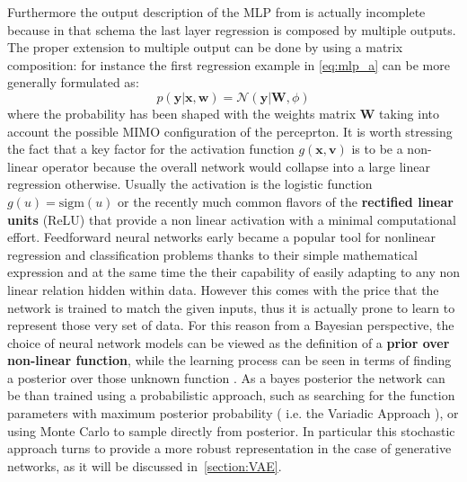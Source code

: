 Furthermore the output description of the \acs{MLP} from \Figure{\ref{fig:generic_mlp_a}} is actually incomplete because in that schema the last layer regression is composed by multiple outputs. 
The proper extension to multiple output can be done by using a matrix composition: for instance the first regression example in \eqref{eq:mlp_a} can be more generally formulated as:
\begin{equation}
    p(\bm{y}|\bm{x}, \bm{w}) = \mathcal{N}\left( \bm{y}|\bm{W},\phi \right)
\end{equation}
where the probability has been shaped with the weights matrix $\bm{W}$ taking into account the possible MIMO configuration of the perceprton.
It is worth stressing the fact that a key factor for the activation function $g(\bm{x},\bm{v})$ is to be a non-linear operator because the overall network would collapse into a large linear regression otherwise. Usually the activation is the logistic function $g(u) = \text{sigm}(u)$ or the recently much common flavors of the \textbf{rectified linear units} (ReLU) that provide a non linear activation with a minimal computational effort.
%
% 
%
Feedforward neural networks early became a popular tool for nonlinear regression and classification problems thanks to their simple mathematical expression and at the same time the their capability of easily adapting to any non linear relation hidden within data. However this comes with the price that the network is trained to match the given inputs, thus it is actually prone to learn to represent those very set of data.
%
For this reason from a Bayesian perspective, the choice of neural network models can be viewed as the definition of a \textbf{prior over non-linear function}, while the learning process can be seen in terms of finding a posterior over those unknown function \cite{Polson_2017}. 
As a bayes posterior the network can be than trained using a probabilistic approach, such as searching for the function parameters with maximum posterior probability ( i.e. the Variadic Approach ), or using Monte Carlo to sample directly from posterior. In particular this stochastic approach turns to provide a more robust representation in the case of generative networks, as it will be discussed in~\cref{section:VAE}.
%

